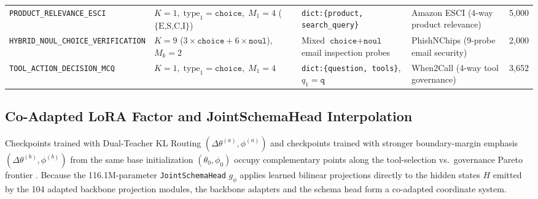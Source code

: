 \documentclass[10pt,twocolumn]{article}
\begin{document}
\begin{table}[t]
{\begin{tabular}{llllc}
\texttt{PRODUCT\_RELEVANCE\_ESCI} & $K = 1,\; \text{type}_1 = \texttt{choice},\; M_1 = 4$ ($\{\text{E,S,C,I}\}$) & \texttt{dict:\{product, search\_query\}} & Amazon ESCI (4-way product relevance) & 5,000 \\
\texttt{HYBRID\_NOUL\_CHOICE\_VERIFICATION} & $K = 9$ ($3\times\texttt{choice} + 6\times\texttt{noul}$),\; $M_k = 2$ & Mixed $\texttt{choice}+\texttt{noul}$ email inspection probes & PhishNChips (9-probe email security) & 2,000 \\
\texttt{TOOL\_ACTION\_DECISION\_MCQ} & $K = 1,\; \text{type}_1 = \texttt{choice},\; M_1 = 4$ & \texttt{dict:\{question, tools\}}, $q_1 = \texttt{q}$ & When2Call (4-way tool governance) & 3,652 \\
\bottomrule
\end{tabular}%
}
\end{table}

\subsection{Co-Adapted LoRA Factor and JointSchemaHead Interpolation}
Checkpoints trained with Dual-Teacher KL Routing $(\Delta\theta^{(a)}, \phi^{(a)})$ and checkpoints trained with stronger boundary-margin emphasis $(\Delta\theta^{(b)}, \phi^{(b)})$ from the same base initialization $(\theta_0, \phi_0)$ occupy complementary points along the tool-selection vs.\ governance Pareto frontier \citep{wortsman2022modelsoups,ilharco2023taskarithmetic}. Because the 116.1M-parameter \texttt{JointSchemaHead} $g_\phi$ applies learned bilinear projections directly to the hidden states $H$ emitted by the 104 adapted backbone projection modules, the backbone adapters and the schema head form a co-adapted coordinate system.
\end{document}
